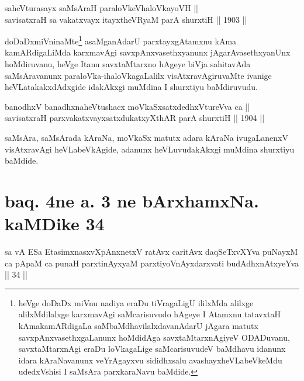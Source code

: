 \begin{shl}
saheVturasayx saMsAraH paraloVkeVhaloVkayoVH || \\
savisatxraH sa vakatxvayx itayxtheVRyaM parA shurxtiH \hfill || 1903 ||
  
\end{shl}

\begin{artha}
doDaDxmiVninaMte\footnote{heVge doDaDx miVnu nadiya eraDu
tiVragaLigU ililxMda alilxge alilxMdilalxge karxmavAgi saMcarisuvudo
hAgeye I Atamxnu tatavxtaH kAmakamARdigaLa saMbaMdhavilalxdavanAdarU
jAgara matutx savxpAnxvasethxgaLanunx hoMdidAga savxtaMtarxnAgiyeV
ODADuvanu, savxtaMtarxnAgi eraDu loVkagaLige saMcarisuvudeV baMdhavu
idanunx idara kAraNavanunx veYrAgayxvu sididhxsalu avashayxheVLabeVkeMdu udedxVshisi I saMsAra parxkaraNavu baMdide.} asaMganAdarU parxtayxgAtamxnu kAma
kamARdigaLiMda karxmavAgi savxpAnxvasethxyanunx jAgarAvasethxyanUnx
hoMdiruvanu, heVge Itanu savxtaMtarxno hAgeye biVja sahitavAda
saMsAravanunx paraloVka-ihaloVkagaLalilx visAtxravAgiruvaMte ivanige
heVLatakakxdAdxgide idakAkxgi muMdina I shurxtiyu baMdiruvudu.
\end{artha}


\begin{shl}
banodhxV banadhxnaheVtushacx moVkaSxsatxdedhxVtureVva ca || \\
savisatxraH parxvakatxvayxsatxdukatxyXthAR parA shurxtiH \hfill || 1904 ||
  
\end{shl}

\begin{artha}
saMsAra, saMsArada kAraNa, moVkaSx matutx adara kAraNa ivugaLanenxV
visAtxravAgi heVLabeVkAgide, adanunx heVLuvudakAkxgi muMdina shurxtiyu
baMdide.
\end{artha}

\section*{baq. 4ne a. 3 ne bArxhamxNa. kaMDike 34}

\begin{shl}
sa vA ESa EtasimxnasxvXpAnxnetxV ratAvx caritAvx daqSeTxvXYva puNayxM ca pApaM ca punaH parxtinAyxyaM parxtiyoVnAyxdarxvati budAdhxnAtxyeYva || 34 ||
\end{shl}


